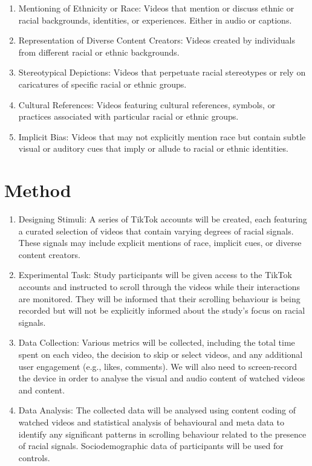 \documentclass[a4paper, 12pt]{article}   %
\begin{document}
\begin{enumerate}
\item Mentioning of Ethnicity or Race: Videos that mention or discuss ethnic or racial backgrounds, identities, or experiences. Either in audio or captions.
\item Representation of Diverse Content Creators: Videos created by individuals from different racial or ethnic backgrounds.
\item Stereotypical Depictions: Videos that perpetuate racial stereotypes or rely on caricatures of specific racial or ethnic groups.
\item Cultural References: Videos featuring cultural references, symbols, or practices associated with particular racial or ethnic groups.
\item Implicit Bias: Videos that may not explicitly mention race but contain subtle visual or auditory cues that imply or allude to racial or ethnic identities.
\end{enumerate}



\section*{Method}

\begin{enumerate}
\item Designing Stimuli: A series of TikTok accounts will be created, each featuring a curated selection of videos that contain varying degrees of racial signals. These signals may include explicit mentions of race, implicit cues, or diverse content creators.
\item Experimental Task: Study participants will be given access to the TikTok accounts and instructed to scroll through the videos while their interactions are monitored. They will be informed that their scrolling behaviour is being recorded but will not be explicitly informed about the study's focus on racial signals.
\item Data Collection: Various metrics will be collected, including the total time spent on each video, the decision to skip or select videos, and any additional user engagement (e.g., likes, comments). We will also need to screen-record the device in order to analyse the visual and audio content of watched videos and content.  
\item Data Analysis: The collected data will be analysed using content coding of watched videos and  statistical analysis of behavioural and meta data  to identify any significant patterns in scrolling behaviour related to the presence of racial signals. Sociodemographic data of participants will be used for controls. 
\end{enumerate}
\end{document}
